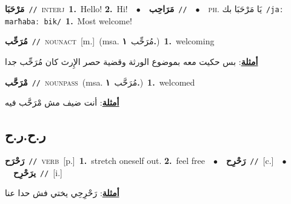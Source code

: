 \documentclass[10pt,a4paper,twoside]{article} %
\begin{document}
\begin{multicols}{2}
{\setlength\topsep{0pt}\textbf{\foreignlanguage{arabic}{مَرْحَبَا}}\ {\color{gray}\texttt{//}\color{black}}\ \textsc{interj}\ \textbf{1.}~Hello!  \textbf{2.}~Hi!\ \ $\bullet$\ \ \setlength\topsep{0pt}\textbf{\foreignlanguage{arabic}{مَرَاحِب}}\ {\color{gray}\texttt{//}\color{black}}\ \ $\bullet$\ \ \textsc{ph.} \color{gray} \foreignlanguage{arabic}{يَا مَرْحَبَا بك}\color{black}\ {\color{gray}\texttt{/{\sffamily jaː marħabaː bik}/}\color{black}}\ \textbf{1.}~Most welcome!\ } \vspace{2mm}

{\setlength\topsep{0pt}\textbf{\foreignlanguage{arabic}{مُرَحِّب}}\ {\color{gray}\texttt{//}\color{black}}\ \textsc{noun\textunderscore act}\ [m.]\ \color{gray}(msa. \foreignlanguage{arabic}{مُرَحِّب}~\foreignlanguage{arabic}{\textbf{١.}})\color{black}\ \textbf{1.}~welcoming\  \begin{flushright}\color{gray}\foreignlanguage{arabic}{\textbf{\underline{\foreignlanguage{arabic}{أمثلة}}}: بس حكيت معه بموضوع الورثة وقضية حصر الإِرث كان مُرَحِّب جدا}\end{flushright}\color{black}} \vspace{2mm}

{\setlength\topsep{0pt}\textbf{\foreignlanguage{arabic}{مْرَحَّب}}\ {\color{gray}\texttt{//}\color{black}}\ \textsc{noun\textunderscore pass}\ \color{gray}(msa. \foreignlanguage{arabic}{مُرَحَّب}~\foreignlanguage{arabic}{\textbf{١.}})\color{black}\ \textbf{1.}~welcomed\  \begin{flushright}\color{gray}\foreignlanguage{arabic}{\textbf{\underline{\foreignlanguage{arabic}{أمثلة}}}: أنت ضيف مش مْرَحَّب فيه}\end{flushright}\color{black}} \vspace{2mm}

\vspace{-3mm}
\subsection*{\color{blue}\foreignlanguage{arabic}{ر.ح.ر.ح}\color{blue}{}} 

{\setlength\topsep{0pt}\textbf{\foreignlanguage{arabic}{رَحْرَح}}\ {\color{gray}\texttt{//}\color{black}}\ \textsc{verb}\ [p.]\ \textbf{1.}~stretch oneself out.  \textbf{2.}~feel free\ \ $\bullet$\ \ \setlength\topsep{0pt}\textbf{\foreignlanguage{arabic}{رَحْرِح}}\ {\color{gray}\texttt{//}\color{black}}\ [c.]\ \ $\bullet$\ \ \setlength\topsep{0pt}\textbf{\foreignlanguage{arabic}{يرَحْرِح}}\ {\color{gray}\texttt{//}\color{black}}\ [i.]\  \begin{flushright}\color{gray}\foreignlanguage{arabic}{\textbf{\underline{\foreignlanguage{arabic}{أمثلة}}}: رَحْرِحِي يختي فش حدا عنا}\end{flushright}\color{black}} \vspace{2mm}


\end{multicols}
\end{document}
